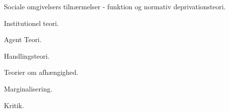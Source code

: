 Sociale omgivelsers tilnærmelser - funktion og normativ deprivationsteori. %

Institutionel teori. %

Agent Teori. %

Handlingsteori. %

Teorier om afhængighed. %

Marginalisering. %

Kritik. %





